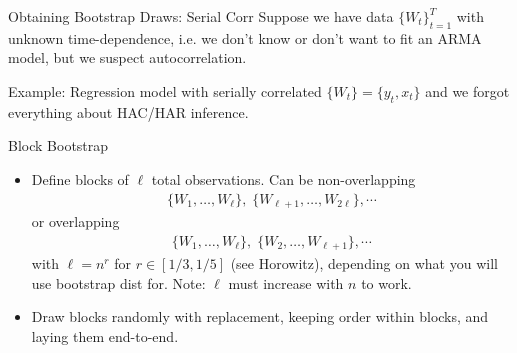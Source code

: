 \documentclass[aspectratio=169, handout]{beamer}
\newcommand{\ra}{\rightarrow}
\begin{document}
{\footnotesize
\begin{frame}{Obtaining Bootstrap Draws: Serial Corr}
Suppose we have data $\{W_t\}_{t=1}^T$ with unknown time-dependence,
i.e. we don't know or don't want to fit an ARMA model, but we suspect
autocorrelation.

Example: Regression model with serially correlated $\{W_t\}=\{y_t,x_t\}$
and we forgot everything about HAC/HAR inference.

\alert{Block Bootstrap}
\begin{itemize}
  \item Define blocks of $\ell$ total observations.
    Can be non-overlapping
    \begin{align*}
      \{W_1,\ldots,W_\ell\},
      \;
      \{W_{\ell+1},\ldots,W_{2\ell}\},
      \cdots
    \end{align*}
    or overlapping
    \begin{align*}
      \{W_1,\ldots,W_\ell\},
      \;
      \{W_{2},\ldots,W_{\ell+1}\},
      \cdots
    \end{align*}
    with $\ell=n^r$ for $r\in[1/3,1/5]$ (see Horowitz),
    depending on what you will use bootstrap dist for.
    Note: $\ell$ must increase with $n$ to work.

  \item Draw blocks randomly with replacement, keeping order within
    blocks, and laying them end-to-end.

\end{itemize}
\end{frame}
}





\end{document}
